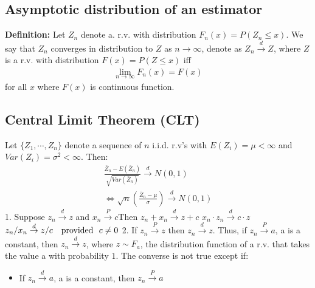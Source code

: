 \documentclass[a4paper,twoside,11pt]{article}
\begin{document}
\subsection{Asymptotic distribution of an estimator}
\textbf{Definition:} Let $Z_n$ denote a. r.v. with distribution $F_n(x) = P(Z_n \le x)$. We say that $Z_n$ converges in distribution to $Z$ as $n \rightarrow \infty$, denote as $Z_n \overset{d}{\rightarrow} Z$, where $Z$ is a r.v. with distribution $F(x) = P(Z \le x)$ iff 
\begin{equation*}
\begin{aligned}
\underset{n \rightarrow \infty}{\lim} F_n(x) = F(x)
\end{aligned}
\end{equation*}
for all $x$ where $F(x)$ is continuous function. 
\newline
\begin{center}
\end{center}
\begin{shaded*}
\subsection{Central Limit Theorem (CLT)}
Let $\{ Z_1, \cdots, Z_n \}$ denote a sequence of $n$ i.i.d. r.v's with $E(Z_i ) = \mu < \infty$ and $Var(Z_i) =\sigma^2 < \infty$. Then:
\begin{equation*}
\begin{aligned}
\frac{\bar Z_n - E(\bar Z_n)}{\sqrt{Var(\bar Z_n)}} \overset{d}{\rightarrow} N(0,1) \\
\Leftrightarrow \sqrt{n}(\frac{\bar Z_n - \mu}{\sigma}) \overset{d}{\rightarrow} N(0,1)
\end{aligned}
\end{equation*}
1. Suppose $z_n \overset{d}{\rightarrow}z$ and $x_n \overset{P}{\rightarrow}c$Then 
\newline
\indent $z_n + x_n \overset{d}{\rightarrow} z+c$ 
\newline
\indent $x_n \cdot z_n \overset{d}{\rightarrow} c \cdot z$ \\
\newline
\indent $z_n /x_n \overset{d}{\rightarrow} z/c \ \ \ \textmd{provided} \ \ c \ne 0$
2. If $z_n \overset{P}{\rightarrow} z$ then $z_n \overset{d}{\rightarrow} z$. Thus, if $z_n \overset{P}{\rightarrow} a$, a is a constant, then $z_n \overset{d}{\rightarrow} z$, where $z \sim F_a$, the distribution function of a r.v. that takes the value a with probability $1$. The converse is not true except if: 
\begin{itemize}
    \item If $z_n \overset{d}{\rightarrow}a $, a is a constant, then $z_n \overset{P}{\rightarrow} a$
\end{itemize}
\end{shaded*}
\end{document}
